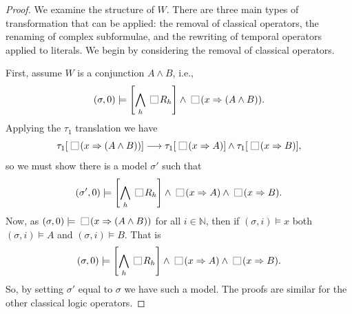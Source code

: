 \documentclass[nohyperref]{acmtrans2f}
\newcommand{\always}{\raisebox{-.2ex}{
                           \mbox{\unitlength=0.9ex
                           \begin{picture}(2,2)
                           \linethickness{0.06ex}
                           \put(0,0){\line(1,0){2}}
                           \put(0,2){\line(1,0){2}}
                           \put(0,0){\line(0,1){2}}
                           \put(2,0){\line(0,1){2}}
                           \end{picture}}}
                          \,}
\let\imp=\Rightarrow
\newcommand{\Nat}{\mbox{\(\mathbb N\)}}
\begin{document}
\begin{proof}
We examine the structure of $W$. There are three main types of
transformation that can be applied: the removal of classical
operators, the renaming of complex subformulae, and the rewriting of
temporal operators applied to literals. We begin by considering the
removal of classical operators.

First, assume $W$ is a conjunction $A \land B$, i.e.,
%
$$(\sigma,0) \models \left[\bigwedge_h \always R_h\right] \land
\always(x \imp (A \land B)).$$
% 
Applying the $\tau_1$ translation we have
$$\tau_1[\always(x \imp (A \land B))]
 \longrightarrow  \tau_1[\always(x  \imp  A)] \land  \tau_1[\always(x
 \imp  B)], 
$$
so we must show there is a model $\sigma'$ such that 
%
$$(\sigma',0) \models \left[\bigwedge_h \always R_h\right] \land
\always(x \imp A) \land \always(x \imp B).$$
%
Now, as $(\sigma,0) \models \always(x \imp (A \land B))$ for all $i
\in \Nat$, then if $(\sigma,i)\models x$ both $(\sigma,i) \models A$
and $(\sigma,i) \models B$. That is 
%
$$(\sigma,0) \models \left[\bigwedge_h \always R_h\right] \land
\always(x \imp A) \land \always(x \imp B).$$
%
So, by setting $\sigma'$ equal to $\sigma$ we have such a model. The
proofs are similar for the other classical logic operators.


\end{proof}
\end{document}
